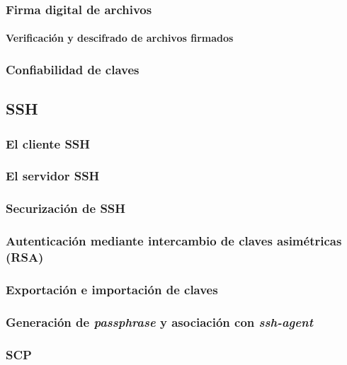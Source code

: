 \documentclass[a4paper, 11pt, titlepage]{article}
\begin{document}
    \subsubsection{Firma digital de archivos}

        \paragraph{Verificación y descifrado de archivos firmados}

    \subsubsection{Confiabilidad de claves}

    \subsection{SSH}

    \subsubsection{El cliente SSH}
    \subsubsection{El servidor SSH}
    \subsubsection{Securización de SSH}
    \subsubsection{Autenticación mediante intercambio de claves asimétricas (RSA)}

        
    \subsubsection{Exportación e importación de claves}
    \subsubsection{Generación de \textit{passphrase} y asociación con \textit{ssh-agent}}
    \subsubsection{SCP} \label{scp}
\end{document}
